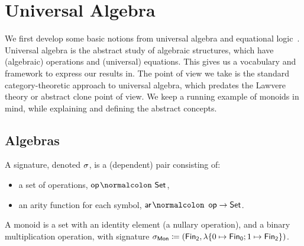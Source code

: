
\section{Universal Algebra}
\label{sec:universal-algebra}

We first develop some basic notions from universal algebra and equational
logic~\cite{birkhoffStructureAbstractAlgebras1935}.
%
Universal algebra is the abstract study of algebraic structures, which have (algebraic) operations and (universal)
equations.
%
This gives us a vocabulary and framework to express our results in.
%
The point of view we take is the standard category-theoretic approach to universal algebra, which predates the Lawvere
theory or abstract clone point of view.
%
We keep a running example of monoids in mind, while explaining and defining the abstract concepts.

\subsection{Algebras}
\label{sec:universal-algebra:algebras}

\begin{definition}[Signature]\label{algebra:signature}
    \label{def:signature}
    A signature, denoted $\sigma$, is a (dependent) pair consisting of:
    \begin{itemize}
        \item a set of operations, $\op\colon \Set$,
        \item an arity function for each symbol, $\ar\colon \op \to \Set$.
    \end{itemize}
\end{definition}

\begin{example}
    A monoid is a set with an identity element (a nullary operation), and a binary multiplication operation,
    with signature $\sigMon \defeq
        (\Fin[2],\lambda \{0 \mapsto \Fin[0] ; 1 \mapsto \Fin[2] \})$.
\end{example}

